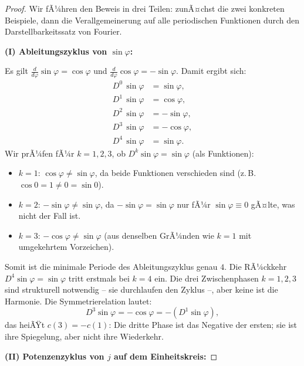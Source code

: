 ﻿\documentclass[a4paper,12pt]{article}
\theoremstyle{definition}
\begin{document}
\begin{proof}
Wir fÃ¼hren den Beweis in drei Teilen: zunÃ¤chst die zwei konkreten Beispiele,
dann die Verallgemeinerung auf alle periodischen Funktionen durch den
Darstellbarkeitssatz von Fourier.

\medskip
\textbf{(I) Ableitungszyklus von $\sin\varphi$:}

Es gilt $\frac{d}{d\varphi}\sin\varphi = \cos\varphi$ und
$\frac{d}{d\varphi}\cos\varphi = -\sin\varphi$. Damit ergibt sich:
\begin{align*}
	D^0\,\sin\varphi &= \sin\varphi, \\
	D^1\,\sin\varphi &= \cos\varphi, \\
	D^2\,\sin\varphi &= -\sin\varphi, \\
	D^3\,\sin\varphi &= -\cos\varphi, \\
	D^4\,\sin\varphi &= \sin\varphi.
\end{align*}
Wir prÃ¼fen fÃ¼r $k = 1, 2, 3$, ob $D^k\sin\varphi = \sin\varphi$ (als Funktionen):
\begin{itemize}
	\item $k=1$: $\cos\varphi \neq \sin\varphi$, da beide Funktionen verschieden sind
	      (z.\,B.\ $\cos 0 = 1 \neq 0 = \sin 0$).
	\item $k=2$: $-\sin\varphi \neq \sin\varphi$, da $-\sin\varphi = \sin\varphi$
	      nur fÃ¼r $\sin\varphi \equiv 0$ gÃ¤lte, was nicht der Fall ist.
	\item $k=3$: $-\cos\varphi \neq \sin\varphi$ (aus denselben GrÃ¼nden wie $k=1$
	      mit umgekehrtem Vorzeichen).
\end{itemize}
Somit ist die minimale Periode des Ableitungszyklus genau $4$. Die RÃ¼ckkehr
$D^4\sin\varphi = \sin\varphi$ tritt erstmals bei $k=4$ ein. Die drei
Zwischenphasen $k=1,2,3$ sind strukturell notwendig -- sie durchlaufen den Zyklus --, 
aber keine ist die Harmonie. Die Symmetrierelation lautet:
\[
	D^3\sin\varphi = -\cos\varphi = -(D^1\sin\varphi),
\]
das heiÃŸt $c(3) = -c(1)$: Die dritte Phase ist das Negative der ersten;
sie ist ihre Spiegelung, aber nicht ihre Wiederkehr.

\medskip
\textbf{(II) Potenzenzyklus von $j$ auf dem Einheitskreis:}


\end{proof}
\end{document}
